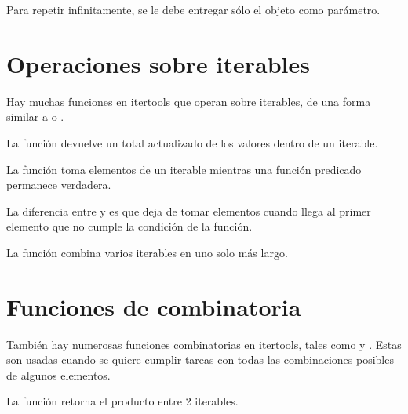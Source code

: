 
Para repetir infinitamente, se le debe entregar sólo el objeto como parámetro.


\section{Operaciones sobre iterables}

Hay muchas funciones en itertools que operan sobre iterables, de una forma similar a  o .
\medskip

La función  devuelve un total actualizado de los valores dentro de un iterable.


La función  toma elementos de un iterable mientras una función predicado permanece verdadera.


La diferencia entre  y  es que  deja de tomar elementos cuando llega al primer elemento que no cumple la condición de la función.


La función  combina varios iterables en uno solo más largo.


\section{Funciones de combinatoria}

También hay numerosas funciones combinatorias en itertools, tales como  y .
Estas son usadas cuando se quiere cumplir tareas con todas las combinaciones posibles de algunos elementos.
\medskip

La función  retorna el producto entre 2 iterables.


